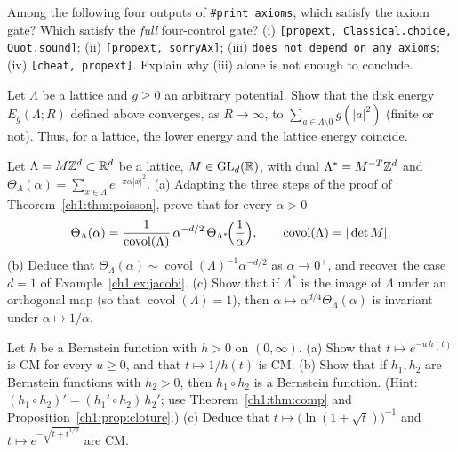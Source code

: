 \begin{exercise}[*]\label{ch1:ex:lean}
Among the following four outputs of \texttt{\#print axioms}, which satisfy the axiom gate? Which satisfy the \emph{full} four-control gate?
(i) \texttt{[propext, Classical.choice, Quot.sound]}; (ii) \texttt{[propext, sorryAx]}; (iii) \texttt{does not depend on any axioms}; (iv) \texttt{[cheat, propext]}.
Explain why (iii) alone is not enough to conclude.
\end{exercise}

\begin{exercise}[**]\label{ch1:ex:fatou}
Let $\Lambda$ be a lattice and $g\ge0$ an arbitrary potential. Show that the disk energy $E_g(\Lambda;R)$ defined above converges, as $R\to\infty$,
to $\sum_{a\in\Lambda\setminus0}g(|a|^2)$ (finite or not). Thus, for a lattice, the lower energy and the lattice energy coincide.
\end{exercise}

\begin{exercise}
Let $\Lambda=M\mathbb{Z}^d\subset\mathbb{R}^d$ be a lattice, $M\in\mathrm{GL}_d(\mathbb{R})$, with dual $\Lambda^*=M^{-T}\mathbb{Z}^d$ and $\Theta_\Lambda(\alpha)=\sum_{x\in\Lambda}e^{-\pi\alpha|x|^2}$.
(a) Adapting the three steps of the proof of Theorem~\ref{ch1:thm:poisson}, prove that for every $\alpha>0$
\[
  \Theta_\Lambda(\alpha)=\frac{1}{\operatorname{covol}(\Lambda)}\,\alpha^{-d/2}\,\Theta_{\Lambda^*}\!\Bigl(\frac1\alpha\Bigr),\qquad \operatorname{covol}(\Lambda)=|\det M|.
\]
(b) Deduce that $\Theta_\Lambda(\alpha)\sim\operatorname{covol}(\Lambda)^{-1}\alpha^{-d/2}$ as $\alpha\to0^+$, and recover the case $d=1$ of Example~\ref{ch1:ex:jacobi}.
(c) Show that if $\Lambda^*$ is the image of $\Lambda$ under an orthogonal map (so that $\operatorname{covol}(\Lambda)=1$), then $\alpha\mapsto\alpha^{d/4}\Theta_\Lambda(\alpha)$ is invariant under $\alpha\mapsto1/\alpha$.
\end{exercise}

\begin{exercise}
Let $h$ be a Bernstein function with $h>0$ on $(0,\infty)$.
(a) Show that $t\mapsto e^{-u\,h(t)}$ is CM for every $u\ge0$, and that $t\mapsto 1/h(t)$ is CM.
(b) Show that if $h_1,h_2$ are Bernstein functions with $h_2>0$, then $h_1\circ h_2$ is a Bernstein function. (Hint: $(h_1\circ h_2)'=(h_1'\circ h_2)\,h_2'$; use Theorem~\ref{ch1:thm:comp} and Proposition~\ref{ch1:prop:cloture}.)
(c) Deduce that $t\mapsto\bigl(\ln(1+\sqrt t)\bigr)^{-1}$ and $t\mapsto e^{-\sqrt{t+t^{1/2}}}$ are CM.
\end{exercise}

